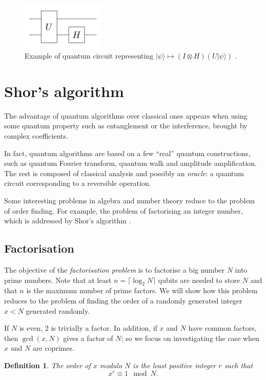 \documentclass[a4paper, 10pt]{article}
\newtheorem{definition}{Definition }[section]
\numberwithin{equation}{section}
\numberwithin{figure}{section}
\numberwithin{table}{section}
\begin{document}
\begin{figure}[h!]
	\centering
	\includegraphics[width=4cm]{Figures/circuit}
	\caption{Example of quantum circuit representing $|\psi\rangle \mapsto (I\otimes H)(U|\psi\rangle)$ \cite{valiron}.}
\end{figure}

\newpage
\section{Shor's algorithm}
\label{section2}

The advantage of quantum algorithms over classical ones appears when using some quantum property such as entanglement or the interference, brought by complex coefficients.

In fact, quantum algorithms are based on a few ``real'' quantum constructions, such as quantum Fourier transform, quantum walk and amplitude amplification. The rest is composed of classical analysis and possibly an \textit{oracle}: a quantum circuit corresponding to a reversible operation.

Some interesting problems in algebra and number theory reduce to the problem of order finding. For example, the problem of factorising an integer number, which is addressed by Shor's algorithm \cite{shor}.

\subsection{Factorisation}

The objective of the \textit{factorisation problem} is to factorise a big number $N$ into prime numbers. Note that at least $n=\lceil\log_2N\rceil$ qubits are needed to store $N$ and that $n$ is the maximum number of prime factors. We will show how this problem reduces to the problem of finding the order of a randomly generated integer $x<N$ generated randomly.

If $N$ is even, 2 is trivially a factor. In addition, if $x$ and $N$ have common factors, then $\gcd(x,N)$ gives a factor of $N$; so we focus on investigating the case when $x$ and $N$ are coprimes.

\begin{definition}
	The order of $x$ modulo $N$ is the least positive integer $r$ such that
	\begin{equation}
		x^r \equiv 1 \mod N.
	\end{equation}
\end{definition}
\end{document}
